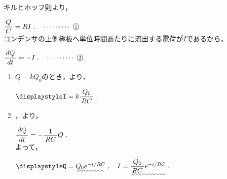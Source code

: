 \documentclass[../../../uem_phy_std_a.tex]{subfiles}
\begin{document}
    キルヒホッフ則より，
    
    \myspaceb%
    $\displaystyle%
        \myfracc{Q}{C} = RI \;.\quad\cdots\cdots\cdots\;\mynumberb{1}
    $\\
    コンデンサの上側極板へ単位時間あたりに流出する電荷が$I$であるから，
    
    \myspaceb%
    $\displaystyle%
        \myfracc{dQ}{dt} = -I \;. \quad\cdots\cdots\cdots\;\mynumberb{2}
    $

    \begin{enumerate}
        \item $Q = kQ_0$のとき，より，
            
            \myspaceb%
            $\displaystyle%
                I = k \myfracc{Q_0}{RC} \;.
            $            
        \item {}，より，
            
            \myspaceb%
            $\displaystyle%
                \myfracc{dQ}{dt} = - \myfraca{1}{RC} Q \;.
            $\\
            よって，
            
            \myspaceb%
            $\displaystyle%
                Q = \uwave{Q_0 e^{-t/RC}} \;,
                \quad I = \uwave{\myfracc{Q_0}{RC} e^{-t/RC}} \;.
            $
    \end{enumerate}
\end{document}
